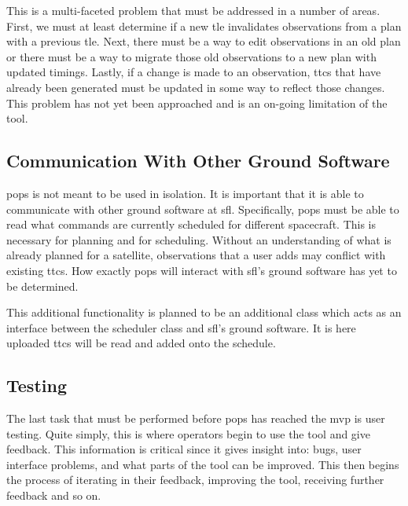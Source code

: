 This is a multi-faceted problem that must be addressed in a number of areas.
First, we must at least determine if a new \gls{tle} invalidates observations
from a plan with a previous \gls{tle}. Next, there must be a way to edit
observations in an old plan or there must be a way to migrate those old
observations to a new plan with updated timings. Lastly, if a change is made to
an observation, \glspl{ttc} that have already been generated must be updated in
some way to reflect those changes. This problem has not yet been approached and
is an on-going limitation of the tool.


\subsection{Communication With Other Ground Software}

\gls{pops} is not meant to be used in isolation. It is important that it is
able to communicate with other ground software at \gls{sfl}. Specifically,
\gls{pops} must be able to read what commands are currently scheduled for
different spacecraft. This is necessary for planning and for scheduling.
Without an understanding of what is already planned for a satellite,
observations that a user adds may conflict with existing \glspl{ttc}. 
How exactly \gls{pops} will interact with \gls{sfl}'s ground software has yet
to be determined.  

This additional functionality is planned to be an additional class which acts
as an interface between the scheduler class and \gls{sfl}'s ground software. It
is here uploaded \glspl{ttc} will be read and added onto the schedule.



\subsection{Testing}

The last task that must be performed before \gls{pops} has reached the
\gls{mvp} is user testing. Quite simply, this is where operators begin to use
the tool and give feedback. This information is critical since it gives insight
into: bugs, user interface problems, and what parts of the tool can be
improved.  This then begins the process of iterating in their feedback,
improving the tool, receiving further feedback and so on.


